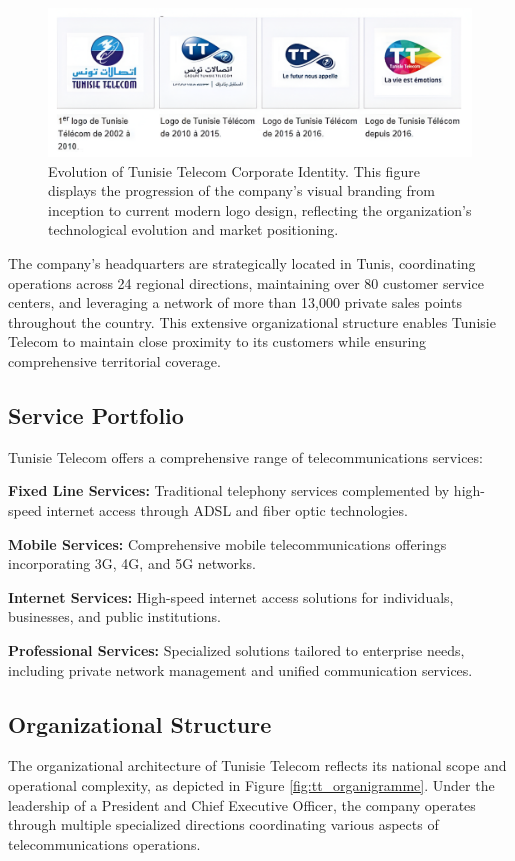 \begin{figure}[H]
    \centering
    \includegraphics[width=0.75\columnwidth]{img/company/logos_update.png}
    \caption{Evolution of Tunisie Telecom Corporate Identity. This figure displays the progression of the company's visual branding from inception to current modern logo design, reflecting the organization's technological evolution and market positioning.}
    \label{fig:tt_logos}
\end{figure}

The company's headquarters are strategically located in Tunis, coordinating operations across 24 regional directions, maintaining over 80 customer service centers, and leveraging a network of more than 13,000 private sales points throughout the country. This extensive organizational structure enables Tunisie Telecom to maintain close proximity to its customers while ensuring comprehensive territorial coverage.

\subsection{Service Portfolio}
Tunisie Telecom offers a comprehensive range of telecommunications services:

\textbf{Fixed Line Services:} Traditional telephony services complemented by high-speed internet access through ADSL and fiber optic technologies.

\textbf{Mobile Services:} Comprehensive mobile telecommunications offerings incorporating 3G, 4G, and 5G networks.

\textbf{Internet Services:} High-speed internet access solutions for individuals, businesses, and public institutions.

\textbf{Professional Services:} Specialized solutions tailored to enterprise needs, including private network management and unified communication services.

\subsection{Organizational Structure}
The organizational architecture of Tunisie Telecom reflects its national scope and operational complexity, as depicted in Figure \ref{fig:tt_organigramme}. Under the leadership of a President and Chief Executive Officer, the company operates through multiple specialized directions coordinating various aspects of telecommunications operations.

